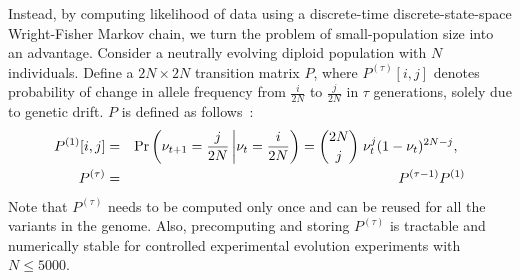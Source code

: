 Instead, by computing likelihood of data using a discrete-time
discrete-state-space Wright-Fisher Markov chain, we turn the problem
of small-population size into an advantage. Consider a neutrally
evolving diploid population with $N$ individuals. Define a
$2N\times2N$ transition matrix $P$, where $P^{(\tau)}[i,j]$ denotes
probability of change in allele frequency from $\frac{i}{2N}$ to
$\frac{j}{2N}$ in $\tau$ generations, solely due to genetic drift. $P$
is defined as follows~\cite{Ewens2012Mathematical}:
\begin{eqnarray}
  P^{(1)}[i,j] &=& \operatorname{Pr}\left(\nu_{t+1}=\frac{j}{2N} \left|
      \nu_{t}=\frac{i}{2N}\right)={2N \choose j} \right.  \nu_{t}^j
  (1-\nu_{t})^{2N-j}, \;\;\label{eq:P1}\\
  P^{(\tau)} &=&   P^{(\tau-1)}P^{(1)} \label{eq:Pt}
\end{eqnarray}
Note that $P^{(\tau)}$ needs to be computed only once and can be reused for all 
the variants in the genome. Also, precomputing and storing $P^{(\tau)}$ is 
tractable and
numerically stable for controlled experimental evolution experiments
with $N\le5000$. 

